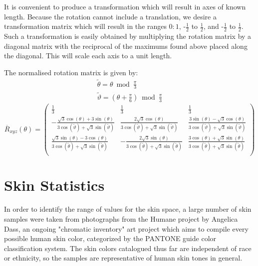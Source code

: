 It is convenient to produce a transformation which will result in axes of known length. Because the rotation cannot include a translation, we desire a transformation matrix which will result in the ranges $0:1$, -$\frac{1}2$ to $\frac{1}2$, and -$\frac{1}2$ to $\frac{1}2$. Such a transformation is easily obtained by multiplying the rotation matrix by a diagonal matrix with the reciprocal of the maximums found above placed along the diagonal. This will scale each axis to a unit length.

The normalised rotation matrix is given by:
\begin{gather*}
  \widetilde{\theta} = \theta  \bmod \frac{\pi }{3} \\
\widetilde{\vartheta} = \left(\theta +\frac{\pi }{6}\right) \bmod \frac{\pi }{3}
\end{gather*}
\begin{equation}\label{eq:NormRxyz}
\overline{R}_{xyz}(\theta) =
\left(
\begin{array}{ccc}
 \frac{1}{3} & \frac{1}{3} & \frac{1}{3} \\
 -\frac{\sqrt{3} \cos (\theta )+3 \sin (\theta )}{3 \cos \left(\widetilde{\vartheta}\right)+\sqrt{3} \sin \left(\widetilde{\vartheta}\right)} & \frac{2 \sqrt{3} \cos (\theta )}{3 \cos \left(\widetilde{\vartheta}\right)+\sqrt{3} \sin \left(\widetilde{\vartheta}\right)} & \frac{3 \sin (\theta )-\sqrt{3} \cos (\theta )}{3 \cos \left(\widetilde{\vartheta}\right)+\sqrt{3} \sin \left(\widetilde{\vartheta}\right)} \\
 \frac{\sqrt{3} \sin (\theta )-3 \cos (\theta )}{3 \cos \left(\widetilde{\theta}\right)+\sqrt{3} \sin \left(\widetilde{\theta}\right)} & -\frac{2 \sqrt{3} \sin (\theta )}{3 \cos \left(\widetilde{\theta}\right)+\sqrt{3} \sin \left(\widetilde{\theta}\right)} & \frac{3 \cos (\theta )+\sqrt{3} \sin (\theta )}{3 \cos \left(\widetilde{\theta}\right)+\sqrt{3} \sin \left(\widetilde{\theta}\right)} \\
\end{array}
\right)
\end{equation}

\section{Skin Statistics}\label{sec:SkinStatistics}

In order to identify the range of values for the skin space, a large number of skin samples were taken from photographs from the Humane project by Angelica Dass, an ongoing "chromatic inventory" art project which aims to compile every possible human skin color, categorized by the PANTONE guide color classification system. The skin colors catalogued thus far are independent of race or ethnicity, so the samples are representative of human skin tones in general.

